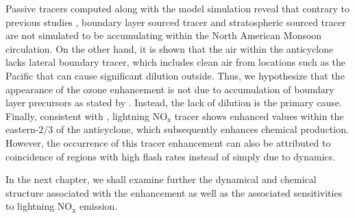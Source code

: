 Passive tracers computed along with the model simulation reveal that
contrary to previous studies \citep[e.g.][]{Li:2005ss,Cooper:2007cr,Barth:2012qf},
boundary layer sourced tracer and stratospheric sourced tracer are not simulated
to be accumulating within the North American Monsoon circulation. On the other
hand, it is shown that the air within the anticyclone lacks lateral boundary tracer,
which includes clean air from locations such as the Pacific that can cause significant
dilution outside. Thus, we hypothesize that the appearance of the ozone
enhancement is not due to accumulation of boundary layer precursors as
stated by \citet{Li:2005ss}. Instead, the lack of dilution is the primary cause. Finally,
consistent with \citet{Cooper:2007cr}, lightning NO$_{\mathrm{x}}$ tracer shows enhanced values
within the eastern-$2/3$ of the anticyclone, which subsequently enhances
chemical production. However, the occurrence of this tracer enhancement
can also be attributed to coincidence of regions with high flash rates instead
of simply due to dynamics.

In the next chapter, we shall examine further the dynamical and chemical
structure associated with the enhancement as well as the associated sensitivities
to lightning NO$_{\mathrm{x}}$ emission.
